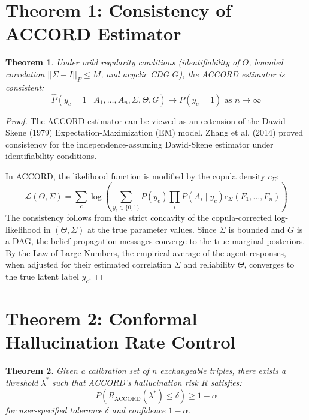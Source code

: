 \documentclass[11pt,a4paper]{article}
\newtheorem{theorem}{Theorem}
\begin{document}
\section{Theorem 1: Consistency of ACCORD Estimator}

\begin{theorem}
Under mild regularity conditions (identifiability of $\Theta$, bounded correlation $||\Sigma - I||_F \leq M$, and acyclic CDG $G$), the ACCORD estimator is consistent:
\begin{equation}
\hat{P}(y_c = 1 \mid A_1, \dots, A_n, \Sigma, \Theta, G) \to P(y_c = 1) \text{ as } n \to \infty
\end{equation}
\end{theorem}

\begin{proof}
The ACCORD estimator can be viewed as an extension of the Dawid-Skene (1979) Expectation-Maximization (EM) model. Zhang et al. (2014) proved consistency for the independence-assuming Dawid-Skene estimator under identifiability conditions. 

In ACCORD, the likelihood function is modified by the copula density $c_\Sigma$:
\begin{equation}
\mathcal{L}(\Theta, \Sigma) = \sum_c \log \left( \sum_{y_c \in \{0,1\}} P(y_c) \prod_i P(A_i \mid y_c) c_\Sigma(F_1, \dots, F_n) \right)
\end{equation}
The consistency follows from the strict concavity of the copula-corrected log-likelihood in $(\Theta, \Sigma)$ at the true parameter values. Since $\Sigma$ is bounded and $G$ is a DAG, the belief propagation messages converge to the true marginal posteriors. By the Law of Large Numbers, the empirical average of the agent responses, when adjusted for their estimated correlation $\Sigma$ and reliability $\Theta$, converges to the true latent label $y_c$.
\end{proof}

\section{Theorem 2: Conformal Hallucination Rate Control}

\begin{theorem}
Given a calibration set of $n$ exchangeable triples, there exists a threshold $\lambda^*$ such that ACCORD's hallucination risk $R$ satisfies:
\begin{equation}
P(R_{\text{ACCORD}}(\lambda^*) \leq \delta) \geq 1 - \alpha
\end{equation}
for user-specified tolerance $\delta$ and confidence $1-\alpha$.
\end{theorem}
\end{document}

